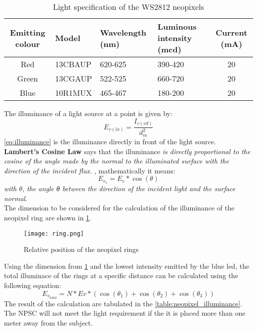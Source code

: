 \begin{table}[h!]
\centering
\caption{Light specification of the WS2812 neopixels}
\label{table:neopixel_specs}
\begin{tabular}{cp{6em}p{6em}p{6em}c}
\hline
\hline
\textbf{Emitting colour} & \textbf{Model} & \textbf{Wavelength (nm)} & \textbf{Luminous intensity (mcd)}  & \textbf{Current (mA)}\\ 
\hline
\hline
Red & 13CBAUP & 620-625 & 390-420 & 20\\
Green & 13CGAUP & 522-525 & 660-720 & 20\\
Blue & 10R1MUX & 465-467 & 180-200 & 20\\
\hline
\hline
\end{tabular}
\end{table}

The illuminance of a light source at a point is given by: 
\begin{equation}\label{eq:illuminance}
E_{v(lx)}=\frac{I_{v(cd)}}{d_m^2}
\end{equation}
\cref{eq:illuminance} is the illuminance directly in front of the light source. \textbf{Lambert's Cosine Law} says that the illuminance \textit{is directly proportional to the cosine of the angle made by the normal to the illuminated surface with the direction of the incident flux.} \cite{optical}, mathematically it means:
\begin{equation}\label{eq:lambert}
E_{v_1}=E_v*\cos(\theta)
\end{equation}
\textit{with $\theta$, the angle θ between the direction of the incident light and the surface normal}.\\
The dimension to be considered for the calculation of the illuminance of the neopixel ring are shown in \cref{fig:neopixel_ring_dimension}.
\begin{figure}[h!]
\centering
\texttt{[image: ring.png]}
\caption{Relative position of the neopixel rings}
\label{fig:neopixel_ring_dimension}
\end{figure}
Using the dimension from \cref{fig:neopixel_ring_dimension} and the lowest intensity emitted by the blue led, the total illuminace of the rings at a specific distance can be calculated using the following equation:
\begin{equation}\label{eq:total_illuminance}
E_{v_{total}} = N*Ev*(\cos(\theta_1)+\cos(\theta_2)+\cos(\theta_3))
\end{equation}
The result of the calculation are tabulated in the \cref{table:neopixel_illuminance}. The NPSC will not meet the light requirement if the it is placed more than one meter away from the subject.

